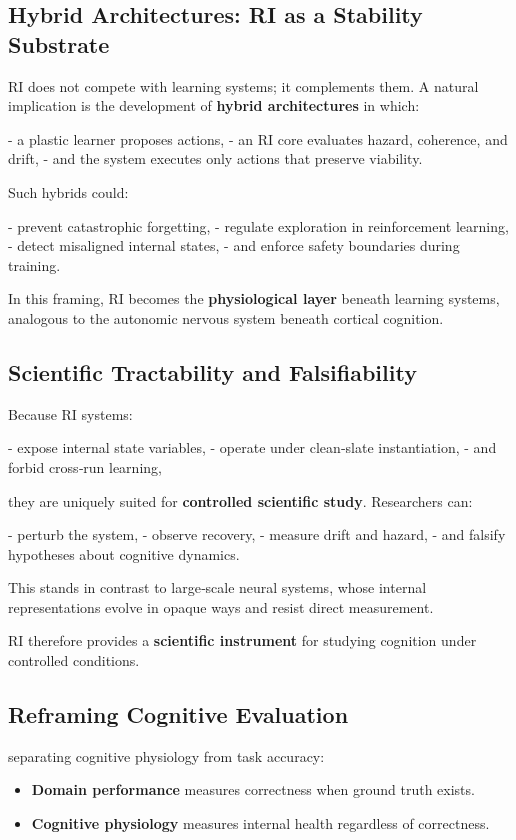 \documentclass[12pt,a4paper]{report}
\begin{document}
\subsection{Hybrid Architectures: RI as a Stability Substrate}

RI does not compete with learning systems; it complements them. A natural implication is the development of \textbf{hybrid architectures} in which:

- a plastic learner proposes actions,  
- an RI core evaluates hazard, coherence, and drift,  
- and the system executes only actions that preserve viability.

Such hybrids could:

- prevent catastrophic forgetting,  
- regulate exploration in reinforcement learning,  
- detect misaligned internal states,  
- and enforce safety boundaries during training.

In this framing, RI becomes the \textbf{physiological layer} beneath learning systems, analogous to the autonomic nervous system beneath cortical cognition.

\subsection{Scientific Tractability and Falsifiability}

Because RI systems:

- expose internal state variables,  
- operate under clean‑slate instantiation,  
- and forbid cross‑run learning,  

they are uniquely suited for \textbf{controlled scientific study}. Researchers can:

- perturb the system,  
- observe recovery,  
- measure drift and hazard,  
- and falsify hypotheses about cognitive dynamics.

This stands in contrast to large‑scale neural systems, whose internal representations evolve in opaque ways and resist direct measurement.

RI therefore provides a \textbf{scientific instrument} for studying cognition under controlled conditions.

\subsection{Reframing Cognitive Evaluation}

separating cognitive physiology from task accuracy:

\begin{itemize}
    \item \textbf{Domain performance} measures correctness when ground truth exists.
    \item \textbf{Cognitive physiology} measures internal health regardless of correctness.
\end{itemize}
\end{document}
